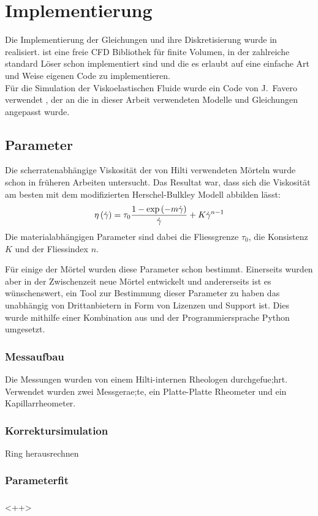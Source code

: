 \section{Implementierung}
\label{Kapitel:Implementierung}
Die Implementierung der Gleichungen und ihre Diskretisierung wurde in \openfoam{} \cite{openfoam} realisiert.
\openfoam{} ist eine freie CFD Bibliothek für finite Volumen, in der zahlreiche standard Löser schon implementiert sind und die es erlaubt auf eine einfache Art und Weise eigenen Code zu implementieren.\\
Für die Simulation der Viskoelastischen Fluide wurde ein Code von J.~Favero verwendet \cite{faveroOF}, der an die in dieser Arbeit verwendeten Modelle und Gleichungen angepasst wurde.
%
\subsection{Parameter}
Die scherratenabhängige Viskosität der von Hilti verwendeten Mörteln wurde schon in früheren Arbeiten untersucht. Das Resultat war, dass sich die Viskosität am besten mit dem modifizierten Herschel-Bulkley Modell abbilden lässt:
\begin{equation}
    \label{eq:modHB}
    \eta\left( \dot\gamma \right) = \tau_0 \frac{1-\exp \left( -m\dot\gamma \right)}{\dot\gamma}+K\dot\gamma^{n-1}
\end{equation}
Die materialabhängigen Parameter sind dabei die Fliessgrenze $\tau_0$, die Konsistenz $K$ und der Fliessindex $n$.

Für einige der Mörtel wurden diese Parameter schon bestimmt. Einerseits wurden aber in der Zwischenzeit neue Mörtel entwickelt und andererseits ist es wünschenswert, ein Tool zur Bestimmung dieser Parameter zu haben das unabhängig von Drittanbietern in Form von Lizenzen und Support ist.
Dies wurde mithilfe einer Kombination aus \openfoam{} und der Programmiersprache Python umgesetzt.
%
\subsubsection{Messaufbau}
Die Messungen wurden von einem Hilti-internen Rheologen durchgefue;hrt. Verwendet wurden zwei Messgerae;te, ein Platte-Platte Rheometer und ein Kapillarrheometer.
%
\subsubsection{Korrektursimulation}
Ring herausrechnen
%
\subsubsection{Parameterfit}
%
\subsubsection{}<++>


